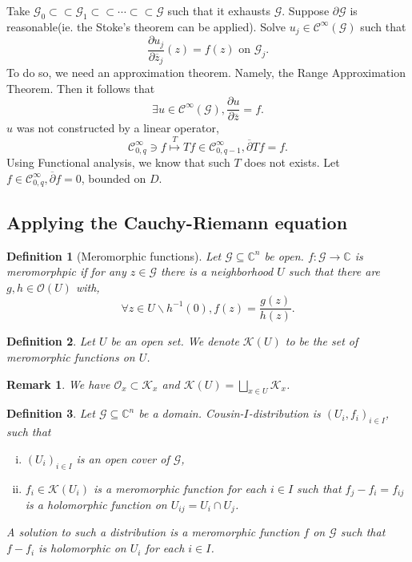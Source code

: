 \documentclass{article}
\newtheorem{definition}{Definition}[section]
\newtheorem{remark}{Remark}[section]
\newcommand{\C}[0]{\mathbb{C}}
\newcommand{\G}[0]{\mathcal{G}}
\newcommand{\pd}[2]{{\frac {\partial#1} {\partial#2}}}
\newcommand{\bd}[0]{\partial}
\newcommand{\cz}[0]{\overline{z}}
\newcommand{\Ouv}[0]{\mathcal{O}}
\newcommand{\compembed}[0]{\subset\subset}
\newcommand{\cpd}[0]{\overline{\partial}}
\newcommand{\on}[0]{\text{ on }}
\newcommand{\ck}[1]{\mathcal{C}^{#1}}
\newcommand{\cinf}[0]{\ck{\infty}}
\begin{document}
Take $\G_0\compembed\G_1\compembed\cdots\compembed\G$ such that it exhausts $\G$. Suppose $\bd\G$ is reasonable(ie. the Stoke's theorem can be applied). 
Solve $u_j\in\cinf(\G)$ such that 
\begin{equation*}
\pd{u_j}{\cz_j}(z) = f(z)\on \G_j.
\end{equation*}
To do so, we need an approximation theorem. Namely, the Range Approximation Theorem. Then it follows that 
\begin{equation*}
  \exists u\in\cinf(\G), \pd{u}{\cz} = f.
\end{equation*}
$u$ was not constructed by a linear operator, 
\begin{equation*}
\cinf_{0,q}\ni f\stackrel{T}{\mapsto}Tf\in\cinf_{0,q-1},\cpd Tf = f.
\end{equation*}
Using Functional analysis, we know that such $T$ does not exists. Let $f\in\cinf_{0,q},\cpd f= 0$, bounded on $D$.
\subsection{Applying the Cauchy-Riemann equation}

\begin{definition}[Meromorphic functions]
  Let $\G\subseteq\C^n$ be open. $f:\G\to\C$ is meromorphpic if for any $z\in\G$ there is a neighborhood $U$ such that there are $g,h\in\Ouv(U)$ with,
  \begin{equation*}
    \forall z\in U\backslash h^{-1}(0), f(z) = {\frac {g(z)} {h(z)}}.
  \end{equation*} 
\end{definition}

\begin{definition}
  Let $U$ be an open set. We denote $\mathcal{K}(U)$ to be the set of meromorphic functions on $U$.
\end{definition}

\begin{remark}
  We have $\Ouv_x\subset\mathcal{K}_x$ and $\mathcal{K}(U) = \bigsqcup_{x\in U}\mathcal{K}_x$.
\end{remark}

\begin{definition}
  Let $\G\subseteq\C^n$ be a domain. Cousin-$I$-distribution is $(U_i,f_i)_{i\in I}$, such that 
  \begin{enumerate}[i).]
    \item $(U_i)_{i\in I}$ is an open cover of $\G$,
    \item $f_i\in\mathcal{K}(U_i)$ is a meromorphic function for each $i\in I$ such that $f_j-f_i = f_{ij}$ is a holomorphic function on $U_{ij}=U_i\cap U_j$.
  \end{enumerate}
  A solution to such a distribution is a meromorphic function $f$ on $\G$ such that $f-f_i$ is holomorphic on $U_i$ for each $i\in I$.
\end{definition}
\end{document}

